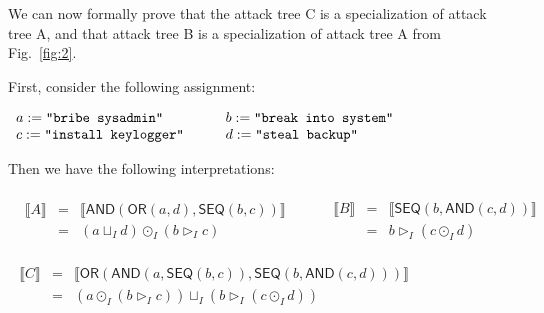 \documentclass{llncs}
\newcommand{\interp}[1]{\llbracket #1 \rrbracket}
\newcommand{\ATermsmv}[1]{\mathit{#1}}
\begin{document}
We can now formally prove that the attack tree C is a specialization
of attack tree A, and that attack tree B is a specialization of attack
tree A from Fig.~\ref{fig:2}.
\begin{example}
  \label{ex:ex1}
  First, consider the following assignment:
\begin{center}
  \begin{math}
    \begin{array}{lllllll}
      a := \verb!"bribe sysadmin"!
      & \quad &
      b := \verb!"break into system"!
      \\
      c := \verb!"install keylogger"!
      & \quad &
      d := \verb!"steal backup"!
    \end{array}
  \end{math}
\end{center}
Then we have the following interpretations:
\begin{center}
  \footnotesize
  \begin{math}
    \begin{array}{c}
      \begin{array}{ccc}
        \begin{array}{rclcl}
        \interp{A} & = & \interp{ \mathsf{AND}(  \mathsf{OR}( \ATermsmv{a} , d )  ,  \mathsf{SEQ}( \ATermsmv{b} , \ATermsmv{c} )  ) } \\
                   & = & (a \sqcup_I d) \odot_I (b \rhd_I c)\\
      \end{array}
      & \quad &
      \begin{array}{rclcl}
        \interp{B} & = & \interp{ \mathsf{SEQ}( \ATermsmv{b} ,  \mathsf{AND}( \ATermsmv{c} , d )  ) } \\
                   & = & b \rhd_I (c \odot_I d)\\      
      \end{array}
      \end{array}
      \\ \\
      \begin{array}{rclcl}
        \interp{C} & = & \interp{ \mathsf{OR}(  \mathsf{AND}( \ATermsmv{a} ,  \mathsf{SEQ}( \ATermsmv{b} , \ATermsmv{c} )  )  ,  \mathsf{SEQ}( \ATermsmv{b} ,  \mathsf{AND}( \ATermsmv{c} , d )  )  ) }\\
                   & = & (a \odot_I (b \rhd_I c)) \sqcup_I (b \rhd_I (c \odot_I d))\\
      \end{array}
    \end{array}        

\end{math}
\end{center}
\end{example}
\end{document}
